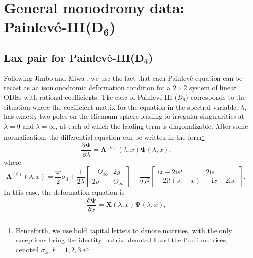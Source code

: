 \documentclass[11pt]{article}
\numberwithin{equation}{section}
\numberwithin{equation}{section}
\newcommand{\ii}{\mathrm{i}}
\begin{document}
\setcounter{section}{3}
\section[General monodromy data: Painleve-III(D\_6)]{General monodromy data: Painlev\'e-III($\boldsymbol{D_6}$)}
\label{sec:monodromy-rep-$D_6$}

\subsection[Lax pair for Painleve-III(D\_6)]{Lax pair for Painlev\'e-III($\boldsymbol{D_6}$)}
\label{sec:lax-pair-$D_6$}

Following Jimbo and Miwa \cite{MR625446}, we use the fact that each Painlev\'e equation can be recast as an isomonodromic deformation condition for a $2\times 2$ system of linear ODEs with rational coefficients. The case of Painlev\'e-III ($D_6$) corresponds to the situation where the coefficient matrix for the equation in the spectral variable, $\lambda$, has exactly two poles on the Riemann sphere leading to irregular singularities at $\lambda = 0$ and $\lambda = \infty$, at each of which the leading term is diagonalizable. After some normalization, the differential equation can be written in the form\footnote{Henceforth, we use bold capital letters to denote matrices, with the only exceptions being the identity matrix, denoted $\mathbb{I}$ and the Pauli matrices, denoted $\sigma_k$, $k = 1, 2, 3$.}
\begin{equation}
\label{eq:generic-system}
\frac{\partial\mathbf{\Psi}}{\partial\lambda} = \mathbf{\Lambda}^{(6)}(\lambda, x) \mathbf{\Psi}(\lambda, x),
\end{equation}
where
\begin{equation}
\label{eq:lambda-coefficient-D6}
\mathbf{\Lambda}^{(6)}(\lambda, x) = \frac{\ii x}{2}\sigma_3 + \dfrac{1}{2\lambda} \begin{bmatrix} -\Theta_\infty & 2y \\ 2v & \Theta_\infty \end{bmatrix} + \dfrac{1}{2\lambda^2} \begin{bmatrix} \ii x - 2\ii st & 2\ii s \\ -2\ii t(st - x) & -\ii x + 2\ii st\end{bmatrix},
\end{equation}
In this case, the deformation equation is
\begin{equation}
 \frac{\partial\mathbf{\Psi}}{\partial x} = \mathbf{X}(\lambda, x) \mathbf{\Psi}(\lambda, x),
 \label{eq:generic-deformation}
\end{equation}
\end{document}
